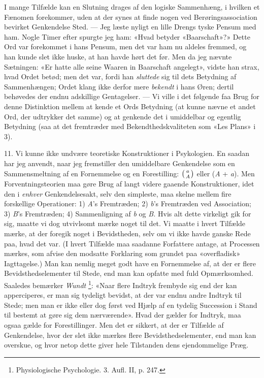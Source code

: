 \documentclass[12pt,a4paper,openany]{book}
\newcommand{\opage}[1]{\marginnote{\footnotesize\textit{[#1]}}}
\begin{document}
I mange Tilfælde kan en Slutning drages af den logiske Sammenhæng, i hvilken et
Fænomen forekommer, uden at der synes at finde nogen ved Berøringsassociation
bevirket Genkendelse Sted. --- Jeg læste nyligt en lille Drengs tyske Pensum
med ham. Nogle Timer efter spurgte jeg ham: «Hvad betyder «Baarschaft»?» Dette
Ord var forekommet i hans Pensum, men det var ham nu aldeles fremmed, og han
kunde slet ikke huske, at han havde hørt det før. Men da jeg nævnte Sætningen:
«Er hatte alle seine Waaren in Baarschaft angelegt», vidste han strax, hvad
Ordet betød; men det var, fordi han \emph{sluttede} sig til dets Betydning af
Sammenhængen; Ordet klang ikke derfor mere \emph{bekendt} i hans Øren; dertil
behøvedes der endnu adskillige Gentagelser. --- Vi ville i det følgende faa
Brug for denne Distinktion mellem at kende et Ords Betydning (at kunne nævne et
andet Ord, der udtrykker det samme) og at genkende det i umiddelbar og egentlig
Betydning (saa at det fremtræder med Bekendthedskvaliteten som «Les Plans» i 3).

11. Vi kunne ikke undvære teoretiske Konstruktioner i Psykologien. En saadan
har jeg anvendt, naar jeg fremstiller den umiddelbare Genkendelse som en
Sammensmeltning af en Fornemmelse og en Forestilling: $\left({a\atop A}\right)$
eller (\textit{A} + \textit{a}). Men Forventningsteorien maa gøre Brug af langt
videre gaaende Konstruktioner, idet den i \emph{enhver} Genkendelsesakt, selv
den simpleste, maa skelne mellem fire forskellige Operationer: 1) \textit{A}'s
Fremtræden; 2) \textit{b}'s Fremtræden ved Association; 3) \textit{B}'s
Fremtræden; 4) Sammenligning af \textit{b} og \textit{B.} Hvis alt dette
virkeligt gik for sig, maatte vi dog utvivlsomt mærke noget til det. Vi maatte
i hvert Tilfælde mærke, at der foregik noget i Bevidstheden, selv om vi ikke
havde ganske Rede paa, hvad det var. (I hvert Tilfælde maa saadanne Forfattere
antage, at Processen mærkes, som afvise den modsatte Forklaring som grundet paa
«overfladisk» Iagttagelse.) Man kan nemlig meget godt have en Fornemmelse af,
at der er flere Bevidsthedselementer til Stede, end man kan opfatte med fuld
Opmærksomhed. Saaledes bemærker \emph{Wundt}%
\footnote[1]{Physiologische Psychologie. 3. Aufl. II, p. 247.}: «Naar flere
Indtryk frembyde sig end der kan apperciperes, er man sig tydeligt
\setcounter{footnote}{0}%
\opage{22}bevidst, at der var endnu andre Indtryk til Stede; men man er ikke
eller dog først ved Hjælp af en tydelig Succession i Stand til bestemt at gøre
sig dem nærværende». Hvad der gælder for Indtryk, maa ogsaa gælde for
Forestillinger. Men det er sikkert, at der er Tilfælde af Genkendelse, hvor der
slet ikke mærkes flere Bevidsthedselementer, end man kan overskue, og hvor
netop dette giver hele Tilstanden dens ejendommelige Præg.
\end{document}
